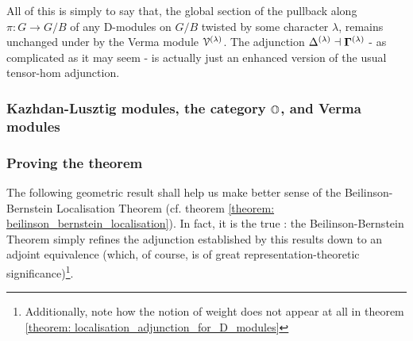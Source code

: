                 All of this is simply to say that, the global section of the pullback along $\pi: G \to G/B$ of any D-modules on $G/B$ twisted by some character $\lambda$, remains unchanged under  by the Verma module $\mathcal{V}^{(\lambda)}$. The adjunction $\Delta^{(\lambda)} \dashv \mathbf{\Gamma}^{(\lambda)}$ - as complicated as it may seem - is actually just an enhanced version of the usual tensor-hom adjunction.
                    
            \subsubsection{Kazhdan-Lusztig modules, the category \texorpdfstring{$\mathbb{O}$}{}, and Verma modules}
                    
            \subsubsection{Proving the theorem}
                The following geometric result shall help us make better sense of the Beilinson-Bernstein Localisation Theorem (cf. theorem \ref{theorem: beilinson_bernstein_localisation}). In fact, it is the true : the Beilinson-Bernstein Theorem simply refines the adjunction established by this results down to an adjoint equivalence (which, of course, is of great representation-theoretic significance)\footnote{Additionally, note how the notion of weight does not appear at all in theorem \ref{theorem: localisation_adjunction_for_D_modules}}.
                
